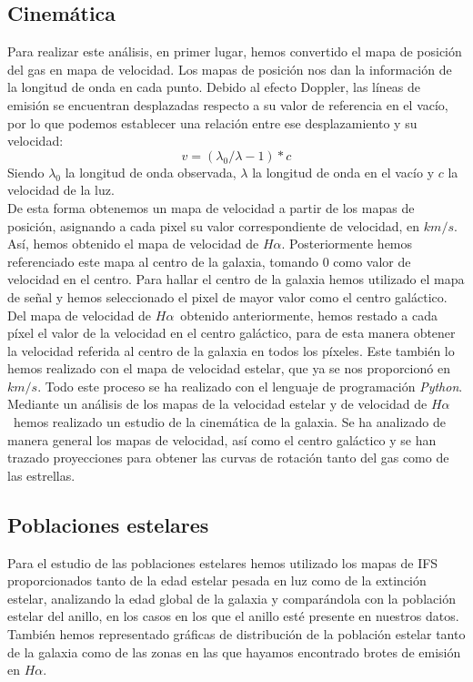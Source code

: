 \documentclass{article}
\newcommand{\hal}{$H\alpha$}
\begin{document}
\subsection{Cinemática}
Para realizar este análisis, en primer lugar, hemos convertido el mapa de posición del gas en mapa de velocidad. Los mapas de posición nos dan la información de la longitud de onda en cada punto. Debido al efecto Doppler, las líneas de emisión se encuentran desplazadas respecto a su valor de referencia en el vacío, por lo que podemos establecer una relación entre ese desplazamiento y su velocidad:
\begin{equation}
v=(\lambda_{0}/\lambda - 1)*c
\end{equation}
Siendo $\lambda_{0}$ la longitud de onda observada, $\lambda$ la longitud de onda en el vacío y $c$ la velocidad de la luz.\\De esta forma obtenemos un mapa de velocidad a partir de los mapas de posición, asignando a cada pixel su valor correspondiente de velocidad, en $km/s$. Así, hemos obtenido el mapa de velocidad de \hal. Posteriormente hemos referenciado este mapa al centro de la galaxia, tomando 0 como valor de velocidad en el centro. Para hallar el centro de la galaxia hemos utilizado el mapa de señal y hemos seleccionado el pixel de mayor valor como el centro galáctico. Del mapa de velocidad de \hal\ obtenido anteriormente, hemos restado a cada píxel el valor de la velocidad en el centro galáctico, para de esta manera obtener la velocidad referida al centro de la galaxia en todos los píxeles. Este también lo hemos realizado con el mapa de velocidad estelar, que ya se nos proporcionó en $km/s$. Todo este proceso se ha realizado con el lenguaje de programación \emph{Python}.\\Mediante un análisis de los mapas de la velocidad estelar y de velocidad de \hal\ hemos realizado un estudio de la cinemática de la galaxia. Se ha analizado de manera general los mapas de velocidad, así como el centro galáctico y se han trazado proyecciones para obtener las curvas de rotación tanto del gas como de las estrellas.

\subsection{Poblaciones estelares}
Para el estudio de las poblaciones estelares hemos utilizado los mapas de IFS proporcionados tanto de la edad estelar pesada en luz como de la extinción estelar, analizando la edad global de la galaxia y comparándola con la población estelar del anillo, en los casos en los que el anillo esté presente en nuestros datos. También hemos representado gráficas de distribución de la población estelar tanto de la galaxia como de las zonas en las que hayamos encontrado brotes de emisión en \hal. 
\end{document}
